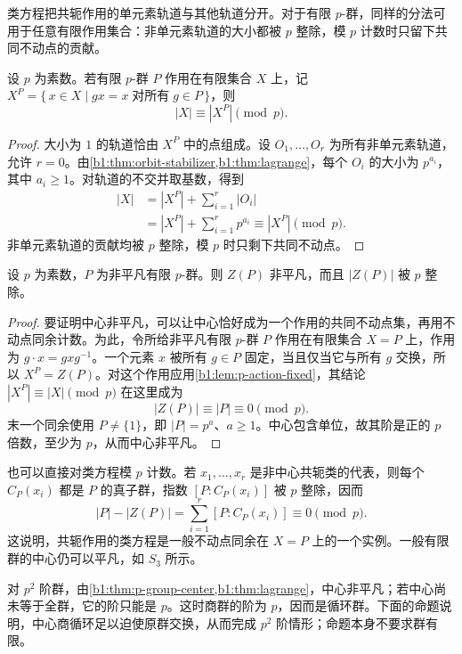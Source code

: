 \ProseParagraphBreak
类方程把共轭作用的单元素轨道与其他轨道分开。对于有限 \(p\)-群，同样的分法可用于任意有限作用集合：非单元素轨道的大小都被 \(p\) 整除，模 \(p\) 计数时只留下共同不动点的贡献。

\begin{lemma}\label{b1:lem:p-action-fixed}
	设 \(p\) 为素数。若有限 \(p\)-群 \(P\) 作用在有限集合 \(X\) 上，记 \(X^P=\{\,x\in X\mid gx=x\;\text{对所有}\;g\in P\,\}\)，则
	\[
		|X|\equiv |X^P|\pmod p.
	\]
\end{lemma}
\begin{proof}
	大小为 \(1\) 的轨道恰由 \(X^P\) 中的点组成。设 \(O_1,\ldots,O_r\) 为所有非单元素轨道，允许 \(r=0\)。由\cref{b1:thm:orbit-stabilizer,b1:thm:lagrange}，每个 \(O_i\) 的大小为 \(p^{a_i}\)，其中 \(a_i\geq1\)。对轨道的不交并取基数，得到
	\[
		\begin{aligned}
			|X|&=|X^P|+\sum_{i=1}^r|O_i|\\
			&=|X^P|+\sum_{i=1}^r p^{a_i} \equiv |X^P|\pmod p.
		\end{aligned}
	\]
	非单元素轨道的贡献均被 \(p\) 整除，模 \(p\) 时只剩下共同不动点。
\end{proof}
\begin{theorem}\label{b1:thm:p-group-center}
	设 \(p\) 为素数，\(P\) 为非平凡有限 \(p\)-群。则 \(Z(P)\) 非平凡，而且 \(|Z(P)|\) 被 \(p\) 整除。
\end{theorem}
\begin{proof}
	要证明中心非平凡，可以让中心恰好成为一个作用的共同不动点集，再用不动点同余计数。为此，令所给非平凡有限 \(p\)-群 \(P\) 作用在有限集合 \(X=P\) 上，作用为 \(g\cdot x=gxg^{-1}\)。一个元素 \(x\) 被所有 \(g\in P\) 固定，当且仅当它与所有 \(g\) 交换，所以 \(X^P=Z(P)\)。对这个作用应用\cref{b1:lem:p-action-fixed}，其结论 \(|X^P|\equiv|X|\pmod p\) 在这里成为
	\[
		\bigl|Z(P)\bigr|\equiv|P|\equiv0\pmod p.
	\]
	末一个同余使用 \(P\neq\{1\}\)，即 \(|P|=p^a\)、\(a\geq1\)。中心包含单位，故其阶是正的 \(p\) 倍数，至少为 \(p\)，从而中心非平凡。
\end{proof}

也可以直接对类方程模 \(p\) 计数。若 \(x_1,\ldots,x_r\) 是非中心共轭类的代表，则每个 \(C_P(x_i)\) 都是 \(P\) 的真子群，指数 \([P:C_P(x_i)]\) 被 \(p\) 整除，因而
\[
	|P|-|Z(P)| =\sum_{i=1}^{r}[P:C_P(x_i)] \equiv0\pmod p.
\]
这说明，共轭作用的类方程是一般不动点同余在 \(X=P\) 上的一个实例。一般有限群的中心仍可以平凡，如 \(S_3\) 所示。

\ProseParagraphBreak
对 \(p^2\) 阶群，由\cref{b1:thm:p-group-center,b1:thm:lagrange}，中心非平凡；若中心尚未等于全群，它的阶只能是 \(p\)。这时商群的阶为 \(p\)，因而是循环群。下面的命题说明，中心商循环足以迫使原群交换，从而完成 \(p^2\) 阶情形；命题本身不要求群有限。

